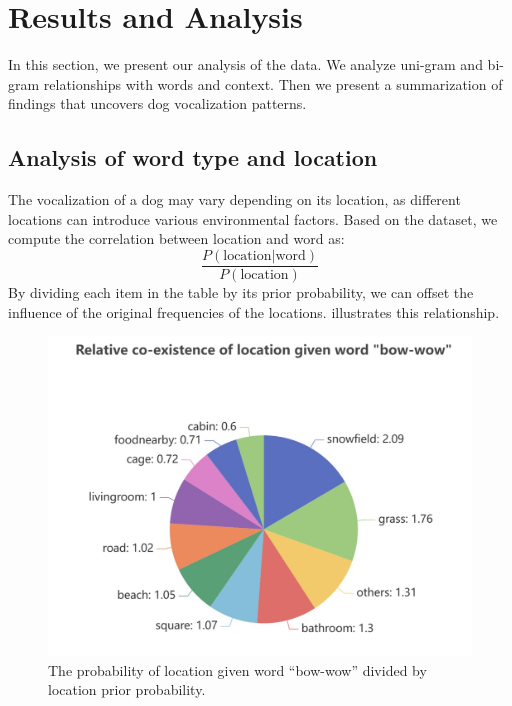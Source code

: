 \section{Results and Analysis}
\label{sec:results}
In this section, we present our analysis of the data. We analyze uni-gram and bi-gram relationships with words and context. Then we present a summarization of findings that uncovers dog vocalization patterns. 
\subsection{Analysis of word type and location}
The vocalization of a dog may vary depending on its location, 
as different locations can introduce various environmental factors. 
Based on the dataset, we compute the correlation between location and word as: 
\begin{equation}
\frac{P (\text{location}| \text{word})}{P(\text{location})}
\end{equation}
By dividing each item in the table by its prior probability, 
we can offset the influence of the original frequencies of the locations. 
 illustrates this relationship.
\begin{figure}[ht]
	\centering
	\includegraphics[width=0.8\columnwidth]{images/relative_bowwow.jpg}
	\caption{
The probability of location given word ``bow-wow'' divided by location prior probability.}
	\label{fig:relative_bowwow}
\end{figure}

